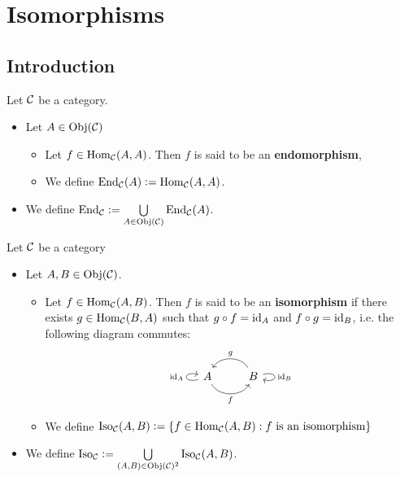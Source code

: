 \documentclass{book}
\begin{document}
	
	
	
	
	
	
	
	
	
	
	
	
	
	\newpage
	\chapter{Isomorphisms}
	
	\section{Introduction}
	
	\begin{defn} 
		Let $\mathcal{C}$ be a category.
		\begin{itemize}
			\item Let $A \in \operatorname{Obj}(\mathcal{C})$
			\begin{itemize}
				\item Let $f \in \operatorname{Hom}_{\mathcal{C}}(A, A)$. Then $f$ is said to be an \textbf{endomorphism},
				\item We define $\operatorname{\text{End}}_{\mathcal{C}}(A) \vcentcolon= \operatorname{Hom}_{\mathcal{C}}(A, A)$.
			\end{itemize}
			\item We define $\operatorname{\text{End}}_{\mathcal{C}} \vcentcolon= \bigcup\limits_{A \in \operatorname{Obj}(\mathcal{C})} \operatorname{\text{End}}_{\mathcal{C}}(A)$.
		\end{itemize}
	\end{defn}
	
	\begin{defn}
		Let $\mathcal{C}$ be a category
		\begin{itemize}
			\item Let $A, B \in \operatorname{Obj}(\mathcal{C})$.
			\begin{itemize}
				\item Let $f \in \operatorname{Hom}_{\mathcal{C}}(A,B)$. Then $f$ is said to be an \textbf{isomorphism} if there exists $g \in \operatorname{Hom}_{\mathcal{C}}(B, A)$ such that $g \circ f = \operatorname{id}_A$ and $f \circ g = \operatorname{id}_B$, i.e. the following diagram commutes: 
				\[ 
				\begin{tikzcd}[baseline= 7]
					\arrow[loop left, "\id_A"] A \arrow[r, bend right= 60, "f", swap] & B \arrow[l, bend left=-60, "g", swap] \arrow[loop right, "\id_B"] \\
				\end{tikzcd}
				\]  
				\item We define $\operatorname{Iso}_{\mathcal{C}}(A,B) \vcentcolon= \{f \in \operatorname{Hom}_{\mathcal{C}}(A,B): \text{$f$ is an isomorphism}\}$
			\end{itemize}
			\item We define $\operatorname{Iso}_{\mathcal{C}} \vcentcolon= \bigcup\limits_{(A,B) \in \operatorname{Obj}(\mathcal{C})^2} \operatorname{Iso}_{\mathcal{C}}(A,B)$.
		\end{itemize}
	\end{defn}
	
\end{document}

